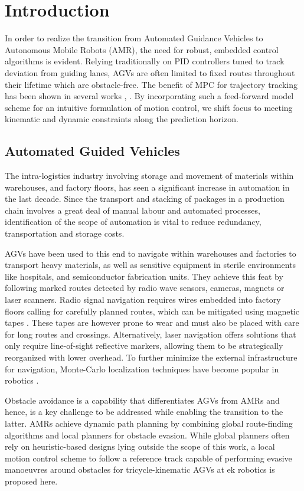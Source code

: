 \chapter{Introduction}\label{chap:introduction}
In order to realize the transition from Automated Guidance Vehicles to Autonomous Mobile Robots (AMR), the need for robust, embedded control algorithms is evident.
Relying traditionally on \ac{PID} controllers tuned to track deviation from guiding lanes, \ac{AGV}s are often limited to fixed routes throughout their lifetime which are obstacle-free. 
The benefit of \ac{MPC} for trajectory tracking has been shown in several works \cite{wang_research_2023}, \cite{zhang_trajectory_2021}. By incorporating such a feed-forward model scheme for an intuitive formulation of motion control, we shift focus to meeting kinematic and dynamic constraints along the prediction horizon.

\section{Automated Guided Vehicles}
The intra-logistics industry involving storage and movement of materials within warehouses, and factory floors, has seen a significant increase in automation in the last decade. Since the transport and stacking of packages in a production chain involves a great deal of manual labour and automated processes, identification of the scope of automation is vital to reduce redundancy, transportation and storage costs.
\par \ac{AGV}s have been used to this end to navigate within warehouses and factories to transport heavy materials, as well as sensitive equipment in sterile environments like hospitals, and semiconductor fabrication units. They achieve this feat by following marked routes detected by radio wave sensors, cameras, magnets or laser scanners. Radio signal navigation requires wires embedded into factory floors calling for carefully planned routes, which can be mitigated using magnetic tapes \cite{zhou_development_2020}. These tapes are however prone to wear and must also be placed with care for long routes and crossings. Alternatively, laser navigation offers solutions that only require line-of-sight reflective markers, allowing them to be strategically reorganized with lower overhead. To further minimize the external infrastructure for navigation, Monte-Carlo localization techniques have become popular in robotics \cite{pires_natural_2021}.
\par Obstacle avoidance is a capability that differentiates \ac{AGV}s from AMRs and hence, is a key challenge to be addressed while enabling the transition to the latter. AMRs achieve dynamic path planning by combining global route-finding algorithms and local planners for obstacle evasion. 
 While global planners often rely on heuristic-based designs lying outside the scope of this work, a local motion control scheme to follow a reference track capable of performing evasive manoeuvres around obstacles for tricycle-kinematic \ac{AGV}s at ek robotics is proposed here.

